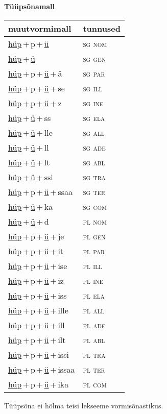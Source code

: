 
\vspace{1.8em}
\begin{minipage}{\textwidth}
\textbf{Tüüpsõnamall \,}\\

\begin{sideways}
\begin{tabular}{l l}
muutvormimall & tunnused \\
\hline
\underline{hüp}\,+\,p\,+\,\underline{ü} & \textsc{ sg nom } \\
\underline{hüp}\,+\,\underline{ü} & \textsc{ sg gen } \\
\underline{hüp}\,+\,p\,+\,\underline{ü}\,+\,ä & \textsc{ sg par } \\
\underline{hüp}\,+\,p\,+\,\underline{ü}\,+\,se & \textsc{ sg ill } \\
\underline{hüp}\,+\,p\,+\,\underline{ü}\,+\,z & \textsc{ sg ine } \\
\underline{hüp}\,+\,\underline{ü}\,+\,ss & \textsc{ sg ela } \\
\underline{hüp}\,+\,\underline{ü}\,+\,lle & \textsc{ sg all } \\
\underline{hüp}\,+\,\underline{ü}\,+\,ll & \textsc{ sg ade } \\
\underline{hüp}\,+\,\underline{ü}\,+\,lt & \textsc{ sg abl } \\
\underline{hüp}\,+\,\underline{ü}\,+\,ssi & \textsc{ sg tra } \\
\underline{hüp}\,+\,p\,+\,\underline{ü}\,+\,ssaa & \textsc{ sg ter } \\
\underline{hüp}\,+\,\underline{ü}\,+\,ka & \textsc{ sg com } \\
\underline{hüp}\,+\,\underline{ü}\,+\,d & \textsc{ pl nom } \\
\underline{hüp}\,+\,p\,+\,\underline{ü}\,+\,je & \textsc{ pl gen } \\
\underline{hüp}\,+\,p\,+\,\underline{ü}\,+\,it & \textsc{ pl par } \\
\underline{hüp}\,+\,p\,+\,\underline{ü}\,+\,ise & \textsc{ pl ill } \\
\underline{hüp}\,+\,p\,+\,\underline{ü}\,+\,iz & \textsc{ pl ine } \\
\underline{hüp}\,+\,p\,+\,\underline{ü}\,+\,iss & \textsc{ pl ela } \\
\underline{hüp}\,+\,p\,+\,\underline{ü}\,+\,ille & \textsc{ pl all } \\
\underline{hüp}\,+\,p\,+\,\underline{ü}\,+\,ill & \textsc{ pl ade } \\
\underline{hüp}\,+\,p\,+\,\underline{ü}\,+\,ilt & \textsc{ pl abl } \\
\underline{hüp}\,+\,p\,+\,\underline{ü}\,+\,issi & \textsc{ pl tra } \\
\underline{hüp}\,+\,p\,+\,\underline{ü}\,+\,issaa & \textsc{ pl ter } \\
\underline{hüp}\,+\,p\,+\,\underline{ü}\,+\,ika & \textsc{ pl com } \\
\end{tabular}
\end{sideways}
\label{tab:tüüpsõnamall-hüppü}

\end{minipage}

 
\vspace{1em}
\noindent Tüüpsõna ei hõlma teisi lekseeme vormi\-sõnastikus.
